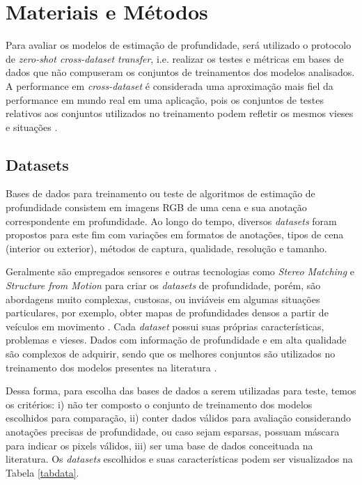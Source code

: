 
\chapter{Materiais e Métodos}

Para avaliar os modelos de estimação de profundidade, será utilizado o protocolo de \textit{zero-shot cross-dataset transfer}, i.e. realizar os testes e métricas em bases de dados que não compuseram os conjuntos de treinamentos dos modelos analisados. A performance em \textit{cross-dataset} é considerada uma aproximação mais fiel da performance em mundo real em uma aplicação, pois os conjuntos de testes relativos aos conjuntos utilizados no treinamento podem refletir os mesmos vieses e situações \cite{ranftl2020towards}.


\section{Datasets}

Bases de dados para treinamento ou teste de algoritmos de estimação de profundidade consistem em imagens RGB de uma cena e sua anotação correspondente em profundidade. Ao longo do tempo, diversos \textit{datasets} foram propostos para este fim com variações em formatos de anotações, tipos de cena (interior ou exterior), métodos de captura, qualidade, resolução e tamanho.


Geralmente são empregados sensores e outras tecnologias como \textit{Stereo Matching} e \textit{Structure from Motion} para criar os \textit{datasets} de profundidade, porém, são abordagens muito complexas, custosas, ou inviáveis em algumas situações particulares, por exemplo, obter mapas de profundidades densos a partir de veículos em movimento  \cite{yang2024depthv1}.
Cada \textit{dataset} possui suas próprias características, problemas e vieses. Dados com informação de profundidade e em alta qualidade são complexos de adquirir, sendo que os melhores conjuntos são utilizados no treinamento dos modelos presentes na literatura \cite{ranftl2020towards}. 



Dessa forma, para escolha das bases de dados a serem utilizadas para teste, temos os critérios: i) não ter composto o conjunto de treinamento dos modelos escolhidos para comparação, ii) conter dados válidos para avaliação considerando anotações precisas de profundidade, ou caso sejam esparsas, possuam máscara para indicar os pixels válidos, iii) ser uma base de dados conceituada na literatura. Os \textit{datasets} escolhidos e suas características podem ser visualizados na Tabela \ref{tabdata}.

